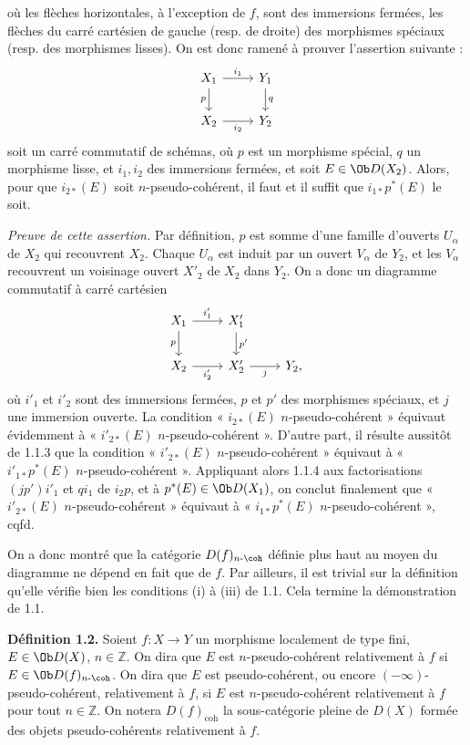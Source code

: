 \documentclass[11pt]{article}
\begin{document}
où les flèches horizontales, à l'exception de \(f\), sont des immersions fermées, les flèches du carré cartésien de gauche (resp. de droite) des morphismes spéciaux (resp. des morphismes lisses). On est donc ramené à prouver l'assertion suivante :
\[
\begin{tikzcd}
X_1 \arrow[r,"i_1"] \arrow[d,"p"'] & Y_1 \arrow[d,"q"]\\
X_2 \arrow[r,"i_2"'] & Y_2
\end{tikzcd}
\]
soit un carré commutatif de schémas, où \(p\) est un morphisme spécial, \(q\) un morphisme lisse, et \(i_1,i_2\) des immersions fermées, et soit \(E\in\Ob D(X_2)\). Alors, pour que \(i_{2*}(E)\) soit \(n\)-pseudo-cohérent, il faut et il suffit que \(i_{1*}p^*(E)\) le soit.

\emph{Preuve de cette assertion.} Par définition, \(p\) est somme d'une famille d'ouverts \(U_\alpha\) de \(X_2\) qui recouvrent \(X_2\). Chaque \(U_\alpha\) est induit par un ouvert \(V_\alpha\) de \(Y_2\), et les \(V_\alpha\) recouvrent un voisinage ouvert \(X'_2\) de \(X_2\) dans \(Y_2\). On a donc un diagramme commutatif à carré cartésien
\[
\begin{tikzcd}
X_1 \arrow[r,"i'_1"] \arrow[d,"p"'] & X'_1 \arrow[d,"p'"]\\
X_2 \arrow[r,"i'_2"'] & X'_2 \arrow[r,"j"'] & Y_2,
\end{tikzcd}
\]
où \(i'_1\) et \(i'_2\) sont des immersions fermées, \(p\) et \(p'\) des morphismes spéciaux, et \(j\) une immersion ouverte. La condition « \(i_{2*}(E)\) \(n\)-pseudo-cohérent » équivaut évidemment à « \(i'_{2*}(E)\) \(n\)-pseudo-cohérent ». D'autre part, il résulte aussitôt de 1.1.3 que la condition « \(i'_{2*}(E)\) \(n\)-pseudo-cohérent » équivaut à « \(i'_{1*}p^*(E)\) \(n\)-pseudo-cohérent ». Appliquant alors 1.1.4 aux factorisations \((jp')i'_1\) et \(qi_1\) de \(i_2p\), et à \(p^*(E)\in\Ob D(X_1)\), on conclut finalement que « \(i'_{2*}(E)\) \(n\)-pseudo-cohérent » équivaut à « \(i_{1*}p^*(E)\) \(n\)-pseudo-cohérent », cqfd.

On a donc montré que la catégorie \(D(f)_{n\text{-}\coh}\) définie plus haut au moyen du diagramme ne dépend en fait que de \(f\). Par ailleurs, il est trivial sur la définition qu'elle vérifie bien les conditions (i) à (iii) de 1.1. Cela termine la démonstration de 1.1.

\textbf{Définition 1.2.} Soient \(f:X\to Y\) un morphisme localement de type fini, \(E\in\Ob D(X)\), \(n\in\mathbb Z\). On dira que \(E\) est \(n\)-pseudo-cohérent relativement à \(f\) si \(E\in\Ob D(f)_{n\text{-}\coh}\). On dira que \(E\) est pseudo-cohérent, ou encore \((-\infty)\)-pseudo-cohérent, relativement à \(f\), si \(E\) est \(n\)-pseudo-cohérent relativement à \(f\) pour tout \(n\in\mathbb Z\). On notera \(D(f)_{\mathrm{coh}}\) la sous-catégorie pleine de \(D(X)\) formée des objets pseudo-cohérents relativement à \(f\).
\end{document}
